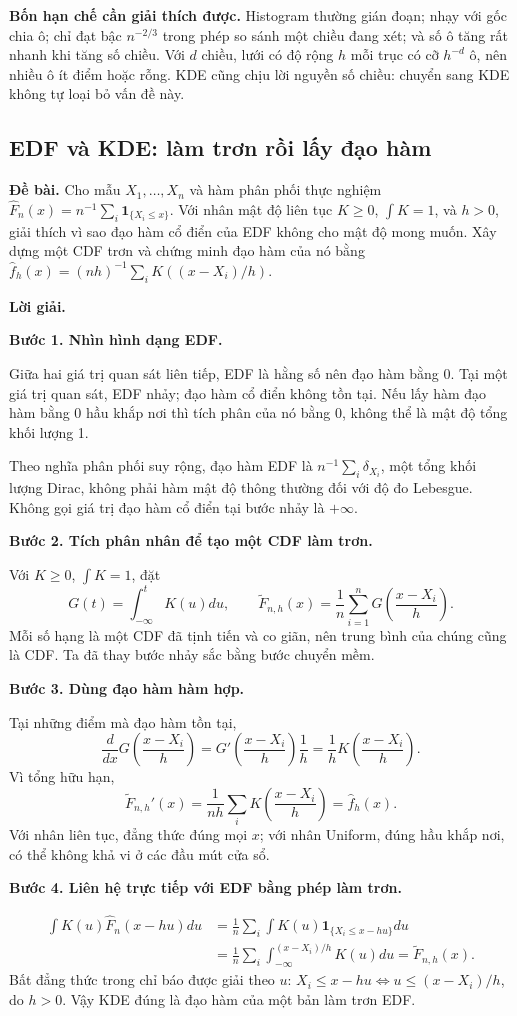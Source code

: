 \documentclass[11pt,a4paper]{article}
\newcommand{\fh}{\widehat f_h}
\newcommand{\buoc}[1]{\par\medskip\textbf{#1}\par}
\begin{document}
\textbf{Bốn hạn chế cần giải thích được.} Histogram thường gián đoạn; nhạy với gốc chia ô; chỉ đạt bậc $n^{-2/3}$ trong phép so sánh một chiều đang xét; và số ô tăng rất nhanh khi tăng số chiều. Với $d$ chiều, lưới có độ rộng $h$ mỗi trục có cỡ $h^{-d}$ ô, nên nhiều ô ít điểm hoặc rỗng. KDE cũng chịu lời nguyền số chiều: chuyển sang KDE không tự loại bỏ vấn đề này.


\subsection{EDF và KDE: làm trơn rồi lấy đạo hàm}\label{sec:edf}
\textbf{Đề bài.} Cho mẫu $X_1,\ldots,X_n$ và hàm phân phối thực nghiệm
$\widehat F_n(x)=n^{-1}\sum_i\mathbf1_{\{X_i\leq x\}}$.
Với nhân mật độ liên tục $K\geq0$, $\int K=1$, và $h>0$,
giải thích vì sao đạo hàm cổ điển của EDF không cho mật độ mong muốn.
Xây dựng một CDF trơn và chứng minh đạo hàm của nó bằng
$\widehat f_h(x)=(nh)^{-1}\sum_iK((x-X_i)/h)$.

\textbf{Lời giải.}

\buoc{Bước 1. Nhìn hình dạng EDF.}
Giữa hai giá trị quan sát liên tiếp, EDF là hằng số nên đạo hàm bằng 0. Tại một giá trị quan sát, EDF nhảy; đạo hàm cổ điển không tồn tại. Nếu lấy hàm đạo hàm bằng 0 hầu khắp nơi thì tích phân của nó bằng 0, không thể là mật độ tổng khối lượng 1.

Theo nghĩa phân phối suy rộng, đạo hàm EDF là $n^{-1}\sum_i\delta_{X_i}$, một tổng khối lượng Dirac, không phải hàm mật độ thông thường đối với độ đo Lebesgue. Không gọi giá trị đạo hàm cổ điển tại bước nhảy là $+\infty$.

\buoc{Bước 2. Tích phân nhân để tạo một CDF làm trơn.}
Với $K\geq0$, $\int K=1$, đặt
\[
G(t)=\int_{-\infty}^tK(u)du,\qquad
\widetilde F_{n,h}(x)=\frac1n\sum_{i=1}^nG\!\left(\frac{x-X_i}{h}\right).
\]
Mỗi số hạng là một CDF đã tịnh tiến và co giãn, nên trung bình của chúng cũng là CDF. Ta đã thay bước nhảy sắc bằng bước chuyển mềm.

\buoc{Bước 3. Dùng đạo hàm hàm hợp.}
Tại những điểm mà đạo hàm tồn tại,
\[
\frac{d}{dx}G\!\left(\frac{x-X_i}{h}\right)
=G'\!\left(\frac{x-X_i}{h}\right)\frac1h
=\frac1hK\!\left(\frac{x-X_i}{h}\right).
\]
Vì tổng hữu hạn,
\[
\boxed{\widetilde F_{n,h}'(x)=\frac1{nh}\sum_iK\!\left(\frac{x-X_i}{h}\right)=\fh(x).}
\]
Với nhân liên tục, đẳng thức đúng mọi $x$; với nhân Uniform, đúng hầu khắp nơi, có thể không khả vi ở các đầu mút cửa sổ.

\buoc{Bước 4. Liên hệ trực tiếp với EDF bằng phép làm trơn.}
\begin{align*}
\int K(u)\widehat F_n(x-hu)du
&=\frac1n\sum_i\int K(u)\mathbf1_{\{X_i\leq x-hu\}}du\\
&=\frac1n\sum_i\int_{-\infty}^{(x-X_i)/h}K(u)du
=\widetilde F_{n,h}(x).
\end{align*}
Bất đẳng thức trong chỉ báo được giải theo $u$: $X_i\leq x-hu\iff u\leq(x-X_i)/h$, do $h>0$. Vậy KDE đúng là đạo hàm của một bản làm trơn EDF.
\end{document}
